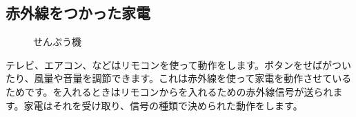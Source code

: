\documentclass[text05.tex]{subfiles}
\begin{document}
\subsection{赤外線をつかった家電}

\begin{figure}[H]
  \begin{minipage}[t]{0.3\columnwidth}
    \centering
 
    \caption{テレビ}
  \end{minipage}
  \begin{minipage}[t]{0.3\columnwidth}
    \centering
    
    \caption{エアコン}
  \end{minipage}
  \begin{minipage}[t]{0.3\columnwidth}
    \centering
    
    \caption{せんぷう機}
  \end{minipage}
\end{figure}

テレビ、エアコン、などはリモコンを使って動作をします。ボタンをせばがついたり、風量や音量を調節できます。これは赤外線を使って家電を動作させているためです。を入れるときはリモコンからを入れるための赤外線信号が送られます。家電はそれを受け取り、信号の種類で決められた動作をします。
\end{document}
